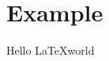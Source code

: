 \documentclass[12pt]{article}
\begin{document}
\section*{Example}

Hello \LaTeX world
\end{document}
